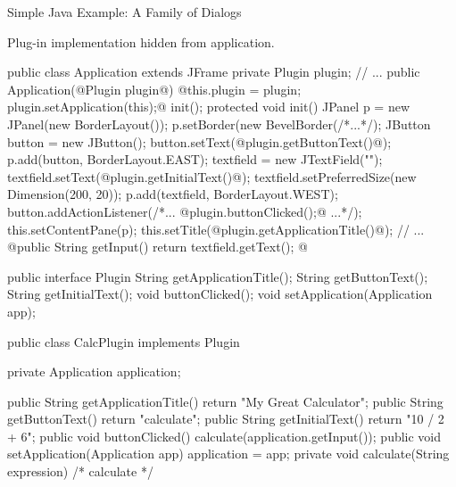 \begin{frame}[fragile]{Simple Java Example: A Family of Dialogs}
	\begin{mycolumns}[columns=2,widths={50,50}]
		\begin{note}{}
			Plug-in implementation hidden from application.
		\end{note}
\begin{codetight}[basicstyle=\tiny]{}
public class Application extends JFrame {
	private Plugin plugin;
	// ...
	public Application(@Plugin plugin@) {
		@this.plugin = plugin;
		plugin.setApplication(this);@
		init();
	}
	protected void init() {
		JPanel p = new JPanel(new BorderLayout());
		p.setBorder(new BevelBorder(/*...*/);
		JButton button = new JButton();
		button.setText(@plugin.getButtonText()@);
		p.add(button, BorderLayout.EAST);
		textfield = new JTextField("");
		textfield.setText(@plugin.getInitialText()@);
		textfield.setPreferredSize(new Dimension(200, 20));
		p.add(textfield, BorderLayout.WEST);		
		button.addActionListener(/*... @plugin.buttonClicked();@ ...*/);
		this.setContentPane(p);		
		this.setTitle(@plugin.getApplicationTitle()@);
		// ...
	}
	@public String getInput() {
		return textfield.getText();
	}@
}
\end{codetight}
		\mynextcolumn
{
\begin{codetight}[basicstyle=\tiny]{}
public interface Plugin {
	String getApplicationTitle();
	String getButtonText();
	String getInitialText();
	void buttonClicked();
	void setApplication(Application app);
}
\end{codetight}
\begin{codetight}[basicstyle=\tiny]{}
public class CalcPlugin implements Plugin {
	private Application application;

	public String getApplicationTitle() {
		return "My Great Calculator";
	}
	public String getButtonText() {
		return "calculate";
	}
	public String getInitialText() {
		return "10 / 2 + 6";
	}
	public void buttonClicked() {
		calculate(application.getInput());
	}
	public void setApplication(Application app) {
		application = app;
	}
	private void calculate(String expression) {
		/* calculate */
	}
}
\end{codetight}
}
	\end{mycolumns}
\end{frame}

